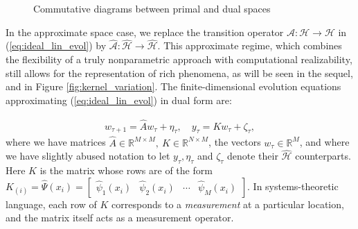 \documentclass[letterpaper,12pt,peerreviewca,draftcls]{IEEEtran}
\newcommand{\R}{\mathbb{R}}
\newcommand{\weight}{w}
\newcommand{\fspace}{\mathcal{H}}
\newcommand{\fmap}{\psi}
\newcommand{\sysop}{\mathcal{A}}
\newcommand{\measnoise}{\zeta}
\newcommand{\processnoise}{\eta}
\newcommand{\meas}{y}
\newcommand{\empK}{\ensuremath{K}}
\newcommand{\nsamp}{N}
\newcommand{\ncent}{M}
\newcommand{\eqlabel}[1]{\label{eq:#1}}
\renewcommand{\eqref}[1]{(\ref{eq:#1})}
\newcommand{\fspaceApprox}{\widehat{\fspace}}
\newcommand{\fmapApprox}{\widehat{\fmap}}
\newcommand{\obsMat}{\empK}
\newcommand{\obsMatRow}{\widehat{\Psi}}
\newcommand{\sysopApprox}{\widehat{\sysop}}
\newcommand{\dualop}{A}
\newcommand{\dualopApprox}{\widehat{\dualop}}
\newcommand{\tindex}{\tau}
\begin{document}
\begin{figure}
	\caption{Commutative diagrams between primal and dual spaces}
	\label{fig:commute_sysop}
\end{figure}



In the approximate space case, we replace the transition operator $\sysop:\fspace\to\fspace$ in \eqref{ideal_lin_evol} by $\sysopApprox:\fspaceApprox\to\fspaceApprox$.
This approximate regime, which combines the flexibility of a truly nonparametric approach with computational realizability, still allows for the representation of rich phenomena, as will be seen in the sequel, and in Figure \ref{fig:kernel_variation}. 
The finite-dimensional evolution equations approximating \eqref{ideal_lin_evol} in dual form are:

\begin{align} \eqlabel{k_measure}
 \weight_{\tindex+1} = \dualopApprox\weight_{\tindex} + \processnoise_{\tindex}, \quad 
 \meas_{\tindex} = \obsMat \weight_{\tindex} +\measnoise_{\tindex},
\end{align}
where we have matrices $\dualopApprox\in \R^{\ncent\times\ncent}, \ \obsMat\in \R^{\nsamp\times\ncent}$, the vectors $\weight_{\tindex}\in\R^{\ncent}$, and where we have slightly abused notation to let $\meas_{\tindex}, \processnoise_{\tindex}$ and $\measnoise_{\tindex}$ denote their $\fspaceApprox$ counterparts. Here $\obsMat$ is the matrix whose rows are of the form $\obsMat_{(i)} = \obsMatRow(x_i) =
 \left[\begin{smallmatrix}
  \fmapApprox_1(x_i) & \fmapApprox_2(x_i) & \cdots & \fmapApprox_{\ncent}(x_i)
 \end{smallmatrix}\right]$. In systems-theoretic language, each row of $\obsMat$ corresponds to a \emph{measurement} at a particular location, and the matrix itself acts as a measurement operator. 
\end{document}
